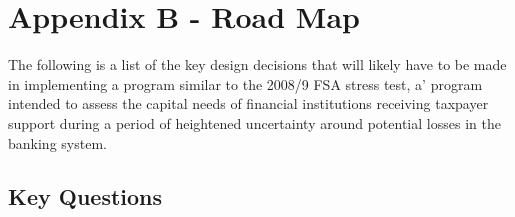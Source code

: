 \documentclass[12pt]{article}
\begin{document}
\section{Appendix B - Road Map}

The following is a list of the key design decisions that will likely have to be made in implementing a program similar to the 2008/9 FSA stress test, a' program intended to assess the capital needs of financial institutions receiving taxpayer support during a period of heightened uncertainty around potential losses in the banking system.

\subsection{Key Questions}

\begin{outline}[enumerate]


\end{outline}
\end{document}

